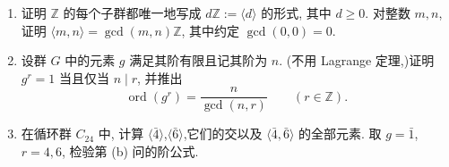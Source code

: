 \documentclass{article}
\begin{document}
\begin{problem}
  \begin{enumerate}
    \item[(a)] 证明 $\mathbb Z$ 的每个子群都唯一地写成 $d\mathbb Z:=\langle d\rangle$ 的形式, 其中 $d\geq0$. 对整数 $m,n$, 证明 $\langle m,n\rangle=\gcd(m,n)\mathbb Z$, 其中约定 $\gcd(0,0)=0$.
    \item[(b)] 设群 $G$ 中的元素 $g$ 满足其阶有限且记其阶为 $n$. (不用 Lagrange 定理,)证明 $g^r=1$ 当且仅当 $n\mid r$, 并推出
      \[
        \operatorname{ord}(g^r)=\frac{n}{\gcd(n,r)}\qquad(r\in\mathbb Z).
      \]
    \item[(c)] 在循环群 $C_{24}$ 中, 计算 $\langle\bar4\rangle$,$\langle\bar6\rangle$,它们的交以及 $\langle\bar4,\bar6\rangle$ 的全部元素. 取 $g=\bar1$, $r=4,6$, 检验第 (b) 问的阶公式.
  \end{enumerate}
\end{problem}
\end{document}
